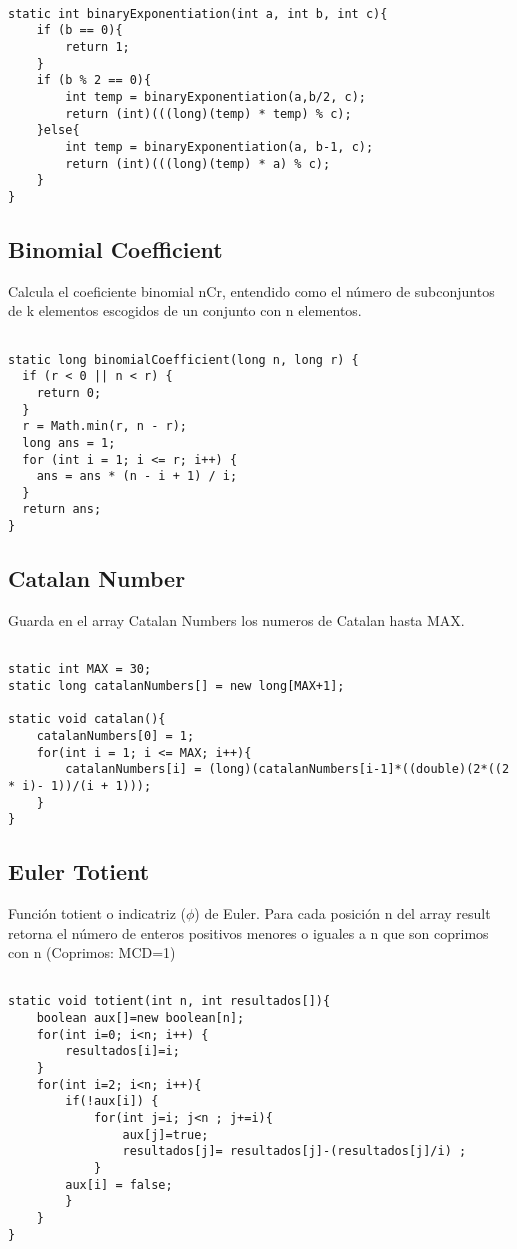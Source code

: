 \documentclass[11pt,letterpaper,twocolumn,twosided]{article}
\begin{document}
\begin{lstlisting}

static int binaryExponentiation(int a, int b, int c){
    if (b == 0){
    	return 1;
    } 
    if (b % 2 == 0){
        int temp = binaryExponentiation(a,b/2, c);
        return (int)(((long)(temp) * temp) % c);
    }else{
        int temp = binaryExponentiation(a, b-1, c);
        return (int)(((long)(temp) * a) % c);
    }
}
\end{lstlisting}

\subsection{Binomial Coefficient}
Calcula el coeficiente binomial nCr, entendido como el n\'umero de subconjuntos  de k elementos escogidos de un conjunto con n elementos.

\begin{lstlisting}

static long binomialCoefficient(long n, long r) {
  if (r < 0 || n < r) { 
  	return 0; 
  }
  r = Math.min(r, n - r);
  long ans = 1;
  for (int i = 1; i <= r; i++) {
    ans = ans * (n - i + 1) / i;
  }
  return ans;
}
\end{lstlisting}

\subsection{Catalan Number}
Guarda en el array Catalan Numbers los numeros de Catalan hasta MAX.

\begin{lstlisting}

static int MAX = 30;
static long catalanNumbers[] = new long[MAX+1];

static void catalan(){
	catalanNumbers[0] = 1;
	for(int i = 1; i <= MAX; i++){
		catalanNumbers[i] = (long)(catalanNumbers[i-1]*((double)(2*((2 * i)- 1))/(i + 1)));
	}
}
\end{lstlisting}

\subsection{Euler Totient}
Funci\'on totient o indicatriz ($\phi $) de Euler. Para cada posici\'on n del array result retorna el n\'umero de enteros positivos menores o iguales a n que son coprimos con n (Coprimos: MCD=1)

\begin{lstlisting}

static void totient(int n, int resultados[]){
	boolean aux[]=new boolean[n];
	for(int i=0; i<n; i++) {
		resultados[i]=i;
	}
	for(int i=2; i<n; i++){
		if(!aux[i]) {
			for(int j=i; j<n ; j+=i){
				aux[j]=true;
				resultados[j]= resultados[j]-(resultados[j]/i) ;
			}
		aux[i] = false;
		}
	}
}
\end{lstlisting}
\end{document}
